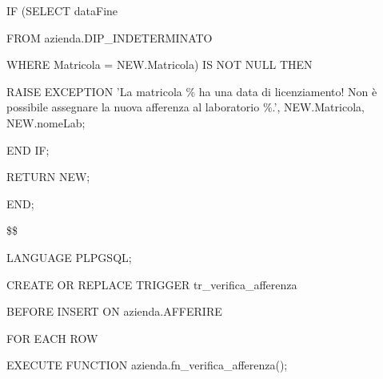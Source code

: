 \begin{flushleft}
\begin{description}
                \vspace{0.5cm}

                \begin{description}
                    \item IF (SELECT dataFine
                    \item \hspace{0.55cm} FROM azienda.DIP\_INDETERMINATO
                    \item \hspace{0.55cm} WHERE Matricola = NEW.Matricola) IS NOT NULL THEN
                    \vspace{0.2cm}
                    \begin{description}
                        \item RAISE EXCEPTION 'La matricola \% ha una data di licenziamento! Non è possibile assegnare la nuova afferenza al laboratorio \%.', NEW.Matricola, NEW.nomeLab;
                    \end{description}
                    \item END IF;
                \end{description}

                \vspace{0.5cm}

                \begin{description}
                    \item RETURN NEW;
                \end{description}

                \item END;
                \item \$\$
                \item LANGUAGE PLPGSQL;
            \end{description}
        \end{flushleft}
    \normalfont

    \ttfamily
        \begin{flushleft}
            \begin{description}
                \item CREATE OR REPLACE TRIGGER tr\_verifica\_afferenza
                \item BEFORE INSERT ON azienda.AFFERIRE
                \item FOR EACH ROW
                \item EXECUTE FUNCTION azienda.fn\_verifica\_afferenza();
            \end{description}
        \end{flushleft}
    \normalfont

